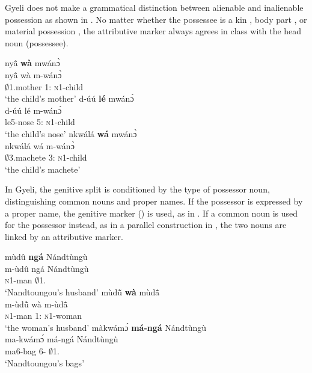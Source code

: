 Gyeli does not make a grammatical distinction between alienable and inalienable possession as shown in . No matter whether the possessee is a kin , body part , or material possession , the attributive marker always agrees in class with the head noun (possessee).

\ea\label{INAL}
\ea \label{INAL1}
  \glll      nyã̂ {\bfseries wà} mwánɔ̀ \\
  nyã̂ wà m-wánɔ̀ \\
               $\emptyset$1.mother 1:{\ATT} \textsc{n}1-child  \\
    \trans `the child's mother'
\ex \label{INAL2}
  \glll     d-úú {\bfseries lé} mwánɔ̀ \\
  d-úú lé m-wánɔ̀ \\
               le5-nose 5:{\ATT} \textsc{n}1-child  \\
    \trans `the child's nose'
\ex \label{INAL3}
  \glll  nkwálá {\bfseries wá} mwánɔ̀ \\
nkwálá wá m-wánɔ̀\\
               $\emptyset$3.machete 3:{\ATT} \textsc{n}1-child  \\
    \trans `the child's machete'
\z
\z

In Gyeli, the genitive split is conditioned by the type of possessor noun, distinguishing common nouns and proper names. If the possessor is expressed by a proper name, the genitive marker () is used, as in .  If a common noun is used for the possessor instead, as in a parallel construction in , the two nouns are linked by an attributive marker.

\ea\label{splitGEN}
\ea \label{splitGEN1}
  \glll      mùdû {\bfseries ngá} Nándtùngù \\
  m-ùdû ngá Nándtùngù \\
\textsc{n}1-man {\GEN} $\emptyset$1.{\PN}  \\
    \trans `Nandtoungou's husband'
\ex \label{splitGEN2}
  \glll  mùdũ̂ {\bfseries wà} mùdã̂\\
  m-ùdũ̂ wà m-ùdã̂ \\
 \textsc{n}1-man 1:{\ATT} \textsc{n}1-woman \\
    \trans `the woman's husband'
\ex \label{splitGEN3}
  \glll màkwámɔ́  {\bfseries má-ngá} Nándtùngù \\
  ma-kwámɔ́ má-ngá Nándtùngù \\
    ma6-bag 6-{\GEN} $\emptyset$1.{\PN}  \\
    \trans `Nandtoungou's bags'
\z
\z

